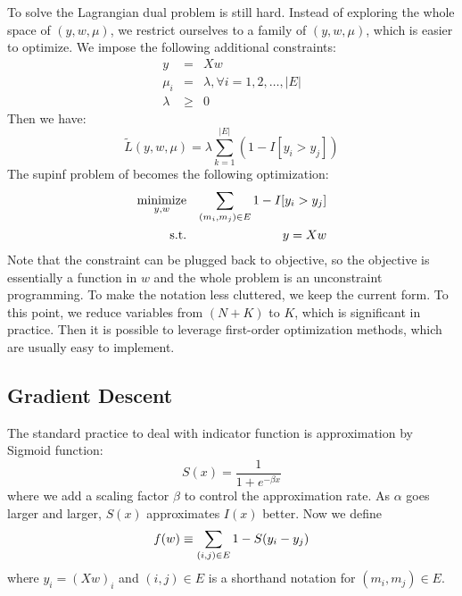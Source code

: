 \documentclass{sig-alternate}
\begin{document}
To solve the Lagrangian dual problem is still hard. 
Instead of exploring the whole space of $(y, w, \mu)$, 
we restrict ourselves to a family of $(y, w, \mu)$, which is easier to optimize. 
We impose the following additional constraints:
\begin{eqnarray}
	y &=& Xw \\
\mu_i &=& \lambda, \forall i = 1,2, \ldots, |E| \\
 \lambda &\ge& 0
\end{eqnarray}
Then we have:
\begin{equation}
	\tilde{L}(y,w,\mu) = \lambda \sum_{k=1}^{|E|}(1 - I[y_i > y_j])
\end{equation}
The supinf problem of \req{\ref{eq:lag_supinf}} becomes the following optimization:
\begin{eqnarray}
	\operatorname*{minimize}_{y,w} && \sum_{(m_i,m_j) \in E} 1 - I[y_i > y_j] \\
	\text{s.t.} && y = Xw
\end{eqnarray}
Note that the constraint can be plugged back to objective, 
so the objective is essentially a function in $w$ 
and the whole problem is an unconstraint programming. 
To make the notation less cluttered, we keep the current form. 
To this point, we reduce variables from $(N +K)$ to $K$, 
which is significant in practice. 
Then it is possible to leverage first-order optimization methods, 
which are usually easy to implement. 

\subsection{Gradient Descent}
\label{sec:Gradient Descent}

The standard practice to deal with indicator function is approximation by Sigmoid function:
\begin{equation}
	S(x) = \frac{1}{1+e^{- \beta x}}
\end{equation}
where we add a scaling factor $\beta$ to control the approximation rate. 
As $\alpha$ goes larger and larger, $S(x)$ approximates $I(x)$ better. 
Now we define
\begin{equation}
	f(w) \equiv \sum_{(i,j) \in E} 1 - S(y_i - y_j) \\
\end{equation}
where $y_i = (Xw)_i$ and $(i,j) \in E$ is a shorthand notation for $(m_i, m_j) \in E$. 
\end{document}
